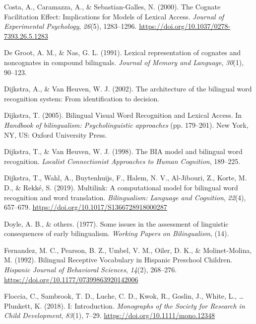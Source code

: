 \documentclass[
  english,
  man,man,floatsintext]{apa6}
\begin{document}
\leavevmode\hypertarget{ref-costa2000}{}%
Costa, A., Caramazza, A., \& Sebastian-Galles, N. (2000). The Cognate Facilitation Effect: Implications for Models of Lexical Access. \emph{Journal of Experimental Psychology}, \emph{26}(5), 1283--1296. \url{https://doi.org/10.1037/0278-7393.26.5.1283}

\leavevmode\hypertarget{ref-de1991lexical}{}%
De Groot, A. M., \& Nas, G. L. (1991). Lexical representation of cognates and noncognates in compound bilinguals. \emph{Journal of Memory and Language}, \emph{30}(1), 90--123.

\leavevmode\hypertarget{ref-dijkstra2002architecture}{}%
Dijkstra, A., \& Van Heuven, W. J. (2002). The architecture of the bilingual word recognition system: From identification to decision.

\leavevmode\hypertarget{ref-dijkstra2005}{}%
Dijkstra, T. (2005). Bilingual Visual Word Recognition and Lexical Access. In \emph{Handbook of bilingualism: Psycholinguistic approaches} (pp. 179--201). New York, NY, US: Oxford University Press.

\leavevmode\hypertarget{ref-dijkstra1998bia}{}%
Dijkstra, T., \& Van Heuven, W. J. (1998). The BIA model and bilingual word recognition. \emph{Localist Connectionist Approaches to Human Cognition}, 189--225.

\leavevmode\hypertarget{ref-dijkstra2019}{}%
Dijkstra, T., Wahl, A., Buytenhuijs, F., Halem, N. V., Al-Jibouri, Z., Korte, M. D., \& Rekké, S. (2019). Multilink: A computational model for bilingual word recognition and word translation. \emph{Bilingualism: Language and Cognition}, \emph{22}(4), 657--679. \url{https://doi.org/10.1017/S1366728918000287}

\leavevmode\hypertarget{ref-doyle1977some}{}%
Doyle, A. B., \& others. (1977). Some issues in the assessment of linguistic consequences of early bilingualism. \emph{Working Papers on Bilingualism}, (14).

\leavevmode\hypertarget{ref-fernandez1992}{}%
Fernandez, M. C., Pearson, B. Z., Umbel, V. M., Oiler, D. K., \& Molinet-Molina, M. (1992). Bilingual Receptive Vocabulary in Hispanic Preschool Children. \emph{Hispanic Journal of Behavioral Sciences}, \emph{14}(2), 268--276. \url{https://doi.org/10.1177/07399863920142006}

\leavevmode\hypertarget{ref-floccia2018}{}%
Floccia, C., Sambrook, T. D., Luche, C. D., Kwok, R., Goslin, J., White, L., \ldots{} Plunkett, K. (2018). I: Introduction. \emph{Monographs of the Society for Research in Child Development}, \emph{83}(1), 7--29. \url{https://doi.org/10.1111/mono.12348}
\end{document}
